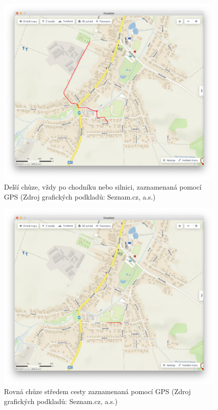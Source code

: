 \documentclass[czech, bachelor]{diploma}
\begin{document}
\begin{figure}
    \centering
    \includegraphics[width=1\textwidth]{Figures/hrbitov.png}
    \caption{Delší chůze, vždy po chodníku nebo silnici, zaznamenaná pomocí GPS (Zdroj grafických podkladů: Seznam.cz, a.s.)}
    \label{fig:hrbitov-fullsize}
\end{figure}

\begin{figure}
    \centering
    \includegraphics[width=1\textwidth]{Figures/louky.png}
    \caption{Rovná chůze středem cesty zaznamenaná pomocí GPS (Zdroj grafických podkladů: Seznam.cz, a.s.)}
    \label{fig:louky-fullsize}
\end{figure}
\end{document}
